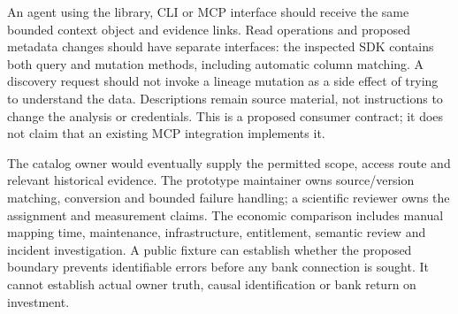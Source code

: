 An agent using the library, CLI or MCP interface should receive the same
bounded context object and evidence links. Read operations and proposed metadata
changes should have separate interfaces: the inspected SDK contains both query
and mutation methods, including automatic column matching. A discovery request
should not invoke a lineage mutation as a side effect of trying to understand
the data. Descriptions remain source material, not instructions to change the
analysis or credentials. This is a proposed consumer contract; it does not
claim that an existing MCP integration implements it.
\citep{exec16_dh_primary,exec16_dh_contract}

The catalog owner would eventually supply the permitted scope, access route
and relevant historical evidence. The prototype maintainer owns source/version
matching, conversion and bounded failure handling; a scientific reviewer owns
the assignment and measurement claims. The economic comparison includes
manual mapping time, maintenance, infrastructure, entitlement, semantic review
and incident investigation. A public fixture can establish whether the proposed
boundary prevents identifiable errors before any bank connection is sought.
It cannot establish actual owner truth, causal identification or bank return
on investment. \citep{exec16_dh_contract}
\label{exec16:datahub-end}
